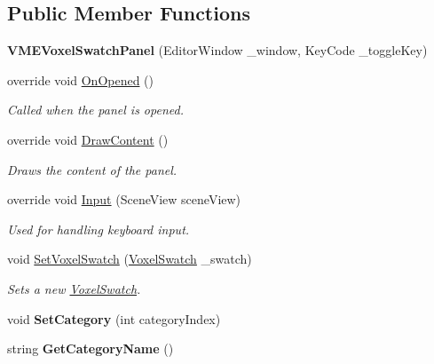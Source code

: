 \subsection*{Public Member Functions}
\begin{DoxyCompactItemize}
\item 
{\bfseries V\+M\+E\+Voxel\+Swatch\+Panel} (Editor\+Window \+\_\+window, Key\+Code \+\_\+toggle\+Key)\hypertarget{class_v_m_e_1_1_v_m_e_voxel_swatch_panel_aa3783e3c8bcbc0336213ff4101f93996}{}\label{class_v_m_e_1_1_v_m_e_voxel_swatch_panel_aa3783e3c8bcbc0336213ff4101f93996}

\item 
override void \hyperlink{class_v_m_e_1_1_v_m_e_voxel_swatch_panel_a1756e7e5d376e59d966b26d21c9e9d3c}{On\+Opened} ()
\begin{DoxyCompactList}\small\item\em Called when the panel is opened. \end{DoxyCompactList}\item 
override void \hyperlink{class_v_m_e_1_1_v_m_e_voxel_swatch_panel_a663cd8478cdcb41c20fc9078f893c3a0}{Draw\+Content} ()
\begin{DoxyCompactList}\small\item\em Draws the content of the panel. \end{DoxyCompactList}\item 
override void \hyperlink{class_v_m_e_1_1_v_m_e_voxel_swatch_panel_a4c94c74221d96e48ed17ecb6b2a98ffb}{Input} (Scene\+View scene\+View)
\begin{DoxyCompactList}\small\item\em Used for handling keyboard input. \end{DoxyCompactList}\item 
void \hyperlink{class_v_m_e_1_1_v_m_e_voxel_swatch_panel_a19fcb070e3d6a3a61ce75602b9476bf6}{Set\+Voxel\+Swatch} (\hyperlink{class_voxel_swatch}{Voxel\+Swatch} \+\_\+swatch)
\begin{DoxyCompactList}\small\item\em Sets a new \hyperlink{class_voxel_swatch}{Voxel\+Swatch}. \end{DoxyCompactList}\item 
void {\bfseries Set\+Category} (int category\+Index)\hypertarget{class_v_m_e_1_1_v_m_e_voxel_swatch_panel_a975a8484811df2ac0c92f47156a4ccc4}{}\label{class_v_m_e_1_1_v_m_e_voxel_swatch_panel_a975a8484811df2ac0c92f47156a4ccc4}

\item 
string {\bfseries Get\+Category\+Name} ()\hypertarget{class_v_m_e_1_1_v_m_e_voxel_swatch_panel_af47fc820fffad77b296ff0b740073c44}{}\label{class_v_m_e_1_1_v_m_e_voxel_swatch_panel_af47fc820fffad77b296ff0b740073c44}


\end{DoxyCompactItemize}
